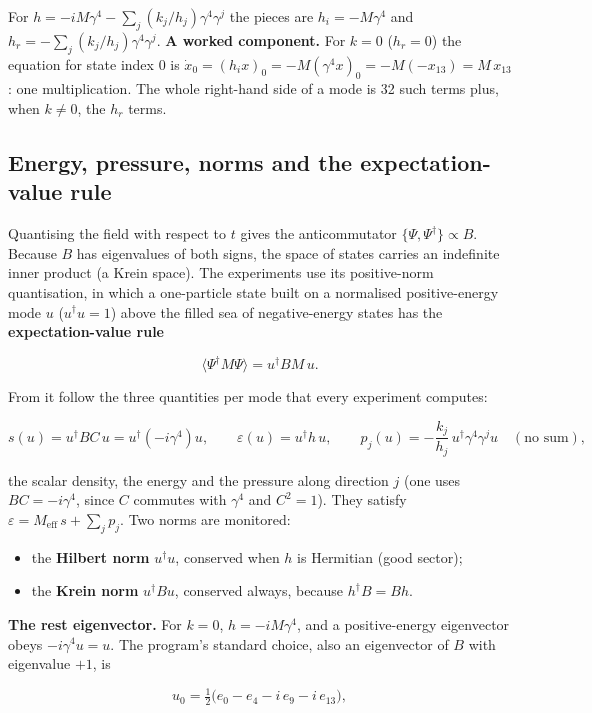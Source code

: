 \documentclass[11pt]{article}
\begin{document}
For $h=-iM\gamma^4-\sum_j(k_j/h_j)\gamma^4\gamma^j$ the pieces are $h_i=-M\gamma^4$ and $h_r=-\sum_j(k_j/h_j)\gamma^4\gamma^j$. \textbf{A worked component.} For $k=0$ ($h_r=0$) the equation for state index 0 is $\dot x_0=(h_ix)_0=-M(\gamma^4x)_0=-M(-x_{13})=M\,x_{13}$: one multiplication. The whole right-hand side of a mode is 32 such terms plus, when $k\ne0$, the $h_r$ terms.

\subsection{Energy, pressure, norms and the expectation-value rule}

Quantising the field with respect to $t$ gives the anticommutator $\{\Psi,\Psi^\dagger\}\propto B$. Because $B$ has eigenvalues of both signs, the space of states carries an indefinite inner product (a Krein space). The experiments use its positive-norm quantisation, in which a one-particle state built on a normalised positive-energy mode $u$ ($u^\dagger u=1$) above the filled sea of negative-energy states has the \textbf{expectation-value rule}

\[
\langle\Psi^\dagger M\Psi\rangle=u^\dagger BM\,u .
\]

From it follow the three quantities per mode that every experiment computes:

\[
s(u)=u^\dagger BC\,u=u^\dagger(-i\gamma^4)u,\qquad \varepsilon(u)=u^\dagger h\,u,\qquad p_j(u)=-\frac{k_j}{h_j}\,u^\dagger\gamma^4\gamma^j u\quad(\text{no sum}),
\]

the scalar density, the energy and the pressure along direction $j$ (one uses $BC=-i\gamma^4$, since $C$ commutes with $\gamma^4$ and $C^2=1$). They satisfy $\varepsilon=M_{\mathrm{eff}}\,s+\sum_jp_j$. Two norms are monitored:

\begin{itemize}
\item the \textbf{Hilbert norm} $u^\dagger u$, conserved when $h$ is Hermitian (good sector);
\item the \textbf{Krein norm} $u^\dagger Bu$, conserved always, because $h^\dagger B=Bh$.
\end{itemize}

\textbf{The rest eigenvector.} For $k=0$, $h=-iM\gamma^4$, and a positive-energy eigenvector obeys $-i\gamma^4u=u$. The program's standard choice, also an eigenvector of $B$ with eigenvalue $+1$, is

\[
u_0=\tfrac12\bigl(e_0-e_4-i\,e_9-i\,e_{13}\bigr),
\]
\end{document}
